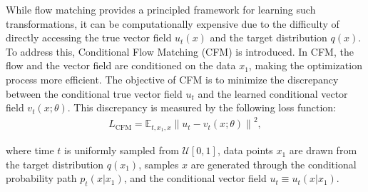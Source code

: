 While flow matching provides a principled framework for learning such transformations, it can be computationally expensive due to the difficulty of directly accessing the true vector field \( u_t(x) \) and the target distribution \( q(x) \). To address this, Conditional Flow Matching (CFM) is introduced. In CFM, the flow and the vector field are conditioned on the data \( x_1 \), making the optimization process more efficient. The objective of CFM is to minimize the discrepancy between the conditional true vector field \( u_t \) and the learned conditional vector field \( v_t(x; \theta) \). This discrepancy is measured by the following loss function:
\begin{align}
L_{\text{CFM}} = \mathbb{E}_{t, x_1, x} \left\| u_t - v_t(x; \theta) \right\|^2,
\end{align}

where time \( t \) is uniformly sampled from \( \mathcal{U}[0,1] \), data points \( x_1 \) are drawn from the target distribution \( q(x_1) \), samples \( x \) are generated through the conditional probability path \( p_t(x|x_1) \), and the conditional vector field \( u_t \equiv u_t(x|x_1) \).